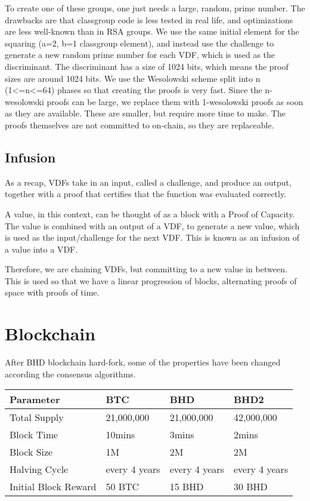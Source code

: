 \begin{flushleft}
    To create one of these groups, one just needs a large, random, prime number. The drawbacks are that classgroup code is less tested in real life, and optimizations are less well-known than in RSA groups. We use the same initial element for the squaring (a=2, b=1 classgroup element), and instead use the challenge to generate a new random prime number for each VDF, which is used as the discriminant. The discriminant has a size of 1024 bits, which means the proof sizes are around 1024 bits. We use the Wesolowski scheme split into n (1<=n<=64) phases so that creating the proofs is very fast. Since the n-wesolowski proofs can be large, we replace them with 1-wesolowski proofs as soon as they are available. These are smaller, but require more time to make. The proofs themselves are not committed to on-chain, so they are replaceable.
\end{flushleft}
\subsection{Infusion}
\begin{flushleft}
    As a recap, VDFs take in an input, called a challenge, and produce an output, together with a proof that certifies that the function was evaluated correctly.
\end{flushleft}
\begin{flushleft}
    A value, in this context, can be thought of as a block with a Proof of Capacity. The value is combined with an output of a VDF, to generate a new value, which is used as the input/challenge for the next VDF. This is known as an infusion of a value into a VDF.
\end{flushleft}
\begin{flushleft}
    Therefore, we are chaining VDFs, but committing to a new value in between. This is used so that we have a linear progression of blocks, alternating proofs of space with proofs of time.
\end{flushleft}
\section{Blockchain}
\begin{flushleft}
    After BHD blockchain hard-fork, some of the properties have been changed according the consensus algorithms.
\end{flushleft}
\begin{tabular}{ |p{4cm}|p{2.5cm}|p{2.5cm}|p{2.5cm}| }
    \hline
    \rowcolor{lightgray} \textbf{Parameter} & \textbf{BTC} & \textbf{BHD} & \textbf{BHD2} \\[5pt]
    \hline
    Total Supply & 21,000,000 & 21,000,000 & 42,000,000 \\[5pt]
    Block Time & 10mins & 3mins & 2mins \\[5pt]
    Block Size & 1M & 2M & 2M \\[5pt]
    Halving Cycle & every 4 years & every 4 years & every 4 years \\[5pt]
    Initial Block Reward & 50 BTC & 15 BHD & 30 BHD \\[5pt]
    \hline
\end{tabular}
